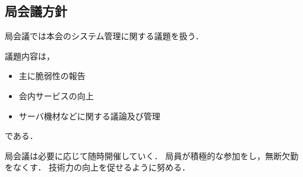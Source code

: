 \subsection*{局会議方針}


局会議では本会のシステム管理に関する議題を扱う．

議題内容は，
\begin{itemize}
    \item 主に脆弱性の報告
    \item 会内サービスの向上
    \item サーバ機材などに関する議論及び管理
\end{itemize}    
である．

局会議は必要に応じて随時開催していく．
局員が積極的な参加をし，無断欠勤をなくす．
技術力の向上を促せるように努める．
